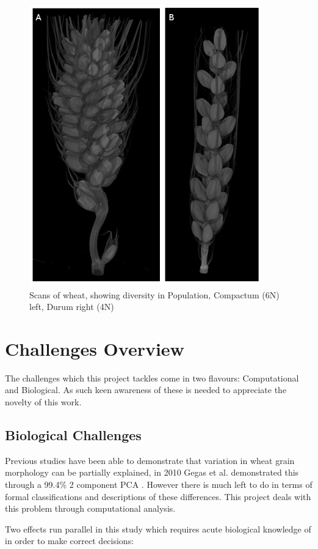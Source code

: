\documentclass[11pt]{report}
\begin{document}
\begin{figure}[htbp]
\centering
\includegraphics[width=10cm]{./images/spikes.png}
\caption{\label{fig:org655dc9b}
Scans of wheat, showing diversity in Population, Compactum (6N) left, Durum right (4N)}
\end{figure}

\section{Challenges Overview}
\label{sec:orgda12ac4}

The challenges which this project tackles come in two flavours: Computational and Biological. As such keen awareness of these is needed to appreciate the novelty of this work.

\subsection{Biological Challenges}
\label{sec:orgc41b792}
Previous studies have been able to demonstrate that variation in wheat grain morphology can be partially explained, in 2010 Gegas et al. demonstrated this through a 99.4\% 2 component PCA \cite{Gegas2010}. However there is much left to do in terms of formal classifications and descriptions of these differences. This project deals with this problem through computational analysis.

Two effects run parallel in this study which requires acute biological knowledge of in order to make correct decisions:
\end{document}
